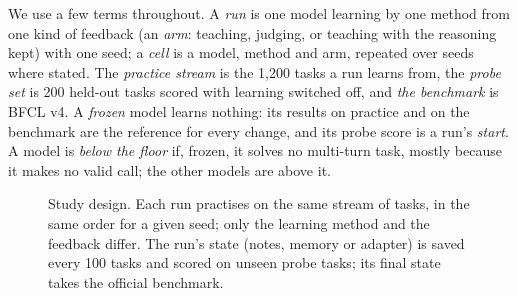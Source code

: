 \documentclass[a4paper,fleqn]{cas-dc}
\begin{document}
We use a few terms throughout. A \emph{run} is one model learning by one method from one kind of feedback (an
\emph{arm}: teaching, judging, or teaching with the reasoning kept) with one seed; a \emph{cell} is a model, method and
arm, repeated over seeds where stated. The \emph{practice stream} is the 1,200 tasks a run learns from, the
\emph{probe set} is 200 held-out tasks scored with learning switched off, and \emph{the benchmark} is BFCL v4. A
\emph{frozen} model learns nothing: its results on practice and on the benchmark are the reference for every change,
and its probe score is a run's \emph{start}. A model is \emph{below the floor} if, frozen, it solves no multi-turn task, mostly because it makes no valid call;
the other models are above it.

\begin{figure}[t]
\centering
{}
\caption{Study design. Each run practises on the same stream of tasks, in the same order for a given seed; only the learning method and
the feedback differ. The run's state (notes, memory or adapter) is saved every 100 tasks and scored on unseen probe
tasks; its final state takes the official benchmark.}\label{fig:design}
\end{figure}
\end{document}
